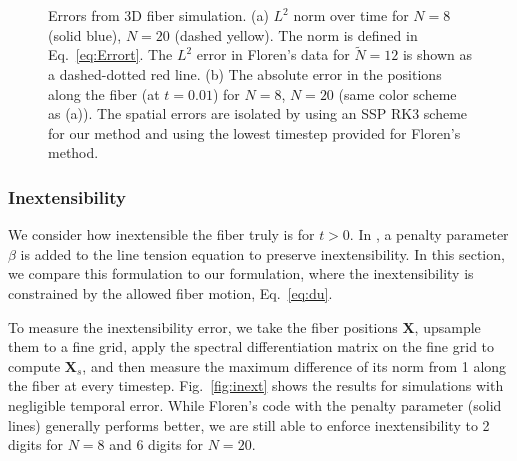 \begin{figure}
\centering 
{}
\caption{Errors from 3D fiber simulation. (a) $L^2$ norm over time for $N=8$ (solid blue), $N=20$ (dashed yellow). The norm is defined in Eq.\ \eqref{eq:Errort}. The $L^2$ error in Floren's data for $\tilde{N}=12$ is shown as a dashed-dotted red line. (b) The absolute error in the positions along the fiber (at $t=0.01$) for $N=8$, $N=20$ (same color scheme as (a)). The spatial errors are isolated by using an SSP RK3 scheme for our method and using the lowest timestep provided for Floren's method.} 
\end{figure}

\subsubsection{Inextensibility}
\label{sec:inext}
We consider how inextensible the fiber truly is for $t > 0$. In \cite{ts04}, a penalty parameter $\beta$ is added to the line tension equation to preserve inextensibility. In this section, we compare this formulation to our formulation, where the inextensibility is constrained by the allowed fiber motion, Eq.\ \eqref{eq:du}. 

To measure the inextensibility error, we take the fiber positions $\bm{X}$, upsample them to a fine grid, apply the spectral differentiation matrix on the fine grid to compute $\bm{X}_s$, and then measure the maximum difference of its norm from 1 along the fiber at every timestep. Fig.\ \ref{fig:inext} shows the results for simulations with negligible temporal error. While Floren's code with the penalty parameter (solid lines) generally performs better, we are still able to enforce inextensibility to 2  digits for $N=8$ and 6 digits for $N=20$.

